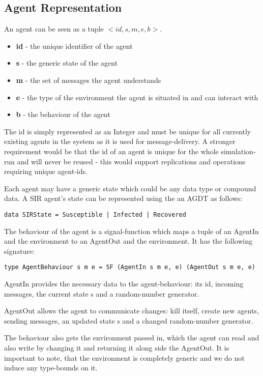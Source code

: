 \subsection{Agent Representation}
An agent can be seen as a tuple $<id, s, m, e, b>$.
\begin{itemize}
	\item \textbf{id} - the unique identifier of the agent
	\item \textbf{s} - the generic state of the agent
	\item \textbf{m} - the set of messages the agent understands
	\item \textbf{e} - the type of the environment the agent is situated in and can interact with
	\item \textbf{b} - the behaviour of the agent
\end{itemize}

The id is simply represented as an Integer and must be unique for all currently existing agents in the system as it is used for message-delivery. A stronger requirement would be that the id of an agent is unique for the whole simulation-run and will never be reused - this would support replications and operations requiring unique agent-ids.

Each agent may have a generic state which could be any data type or compound data. A SIR agent's state can be represented using the an AGDT as follows:
\begin{verbatim}
data SIRState = Susceptible | Infected | Recovered
\end{verbatim}

The behaviour of the agent is a signal-function which maps a tuple of an AgentIn and the environment to an AgentOut and the environment. It has the following signature: 
\begin{verbatim}
type AgentBehaviour s m e = SF (AgentIn s m e, e) (AgentOut s m e, e)
\end{verbatim}

AgentIn provides the necessary data to the agent-behaviour: its id, incoming messages, the current state s and a random-number generator. 

AgentOut allows the agent to communicate changes: kill itself, create new agents, sending messages, an updated state s and a changed random-number generator.

The behaviour also gets the environment passed in, which the agent can read and also write by changing it and returning it along side the AgentOut. It is important to note, that the environment is completely generic and we do not induce any type-bounds on it.

